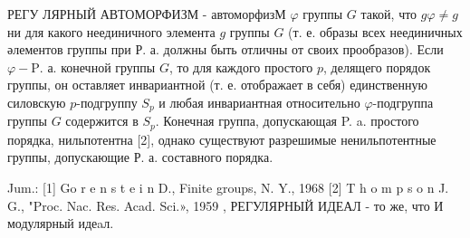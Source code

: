 \documentclass[10pt]{article}
\begin{document}
РЕГУ ЛЯРНЫЙ АВТОМОРФИЗМ - автоморфизМ $\varphi$ группы $G$ такой, что $g \varphi \neq g$ ни для какого неединичного элемента $g$ группы $G$ (т. е. образы всех неединичных әлементов группы при Р. а. должны быть отличны от своих прообразов). Если $\varphi-\mathrm{P}$. а. конечной группы $G$, то для каждого простого $p$, делящего порядок группы, он оставляет инвариантной (т. е. отображает в себя) единственную силовскую $p$-подгруппу $S_{p}$ и любая инвариантная относительно $\varphi$-подгруппа группы $G$ содержится в $S_{p}$. Конечная группа, допускающая P. a. простого порядка, нильпотентна [2], однако существуют разрешимые ненильпотентные группы, допускающие Р. а. составного порядка.



Jum.: [1] Go r e n s t e i n D., Finite groups, N. Y., 1968 [2] T h o m p s o n J. G., "Proc. Nac. Res. Acad. Sci.», 1959 , РЕГУЛЯРНЫЙ ИДЕАЛ - то же, что И модулярный идеaл.
\end{document}
